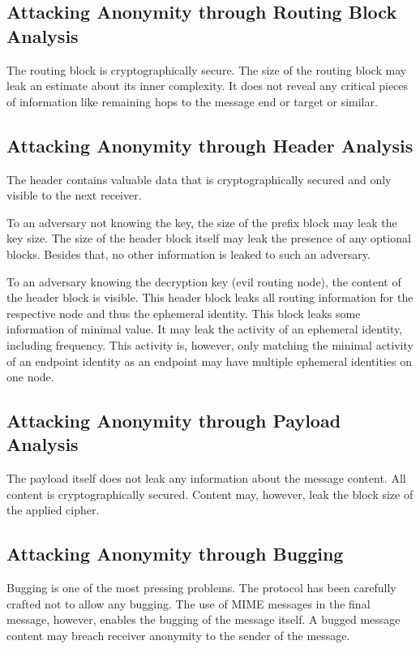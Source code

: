 \subsection{Attacking Anonymity through Routing Block Analysis}
The routing block is cryptographically secure. The size of the routing block may leak an estimate about its inner complexity. It does not reveal any critical pieces of information like remaining hops to the message end or target or similar.

\subsection{Attacking Anonymity through Header Analysis}
The header contains valuable data that is cryptographically secured and only visible to the next receiver. 

To an adversary not knowing the key, the size of the prefix block may leak the key size. The size of the header block itself may leak the presence of any optional blocks. Besides that, no other information is leaked to such an adversary.

To an adversary knowing the decryption key (evil routing node), the content of the header block is visible. This header block leaks all routing information for the respective node and thus the ephemeral identity. This block leaks some information of minimal value. It may leak the activity of an ephemeral identity, including frequency. This activity is, however, only matching the minimal activity of an endpoint identity as an endpoint may have multiple ephemeral identities on one node. 

\subsection{Attacking Anonymity through Payload Analysis}
The payload itself does not leak any information about the message content. All content is cryptographically secured. Content may, however, leak the block size of the applied cipher.

\subsection{Attacking Anonymity through Bugging}
Bugging is one of the most pressing problems. The protocol has been carefully crafted not to allow any bugging. The use of MIME messages in the final message, however, enables the bugging of the message itself. A bugged message content may breach receiver anonymity to the sender of the message.

